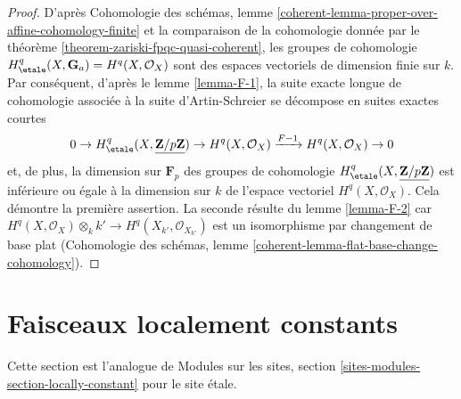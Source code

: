 \begin{proof}
D'apr\`es Cohomologie des schémas, lemme
\ref{coherent-lemma-proper-over-affine-cohomology-finite}
et la comparaison de la cohomologie donn\'ee par le
th\'eor\`eme \ref{theorem-zariski-fpqc-quasi-coherent}, les groupes de cohomologie
$H^q_\etale(X, \mathbf{G}_a) = H^q(X, \mathcal{O}_X)$ sont
des espaces vectoriels de dimension finie sur $k$. Par cons\'equent, d'apr\`es le
lemme \ref{lemma-F-1}, la suite exacte longue de cohomologie
associ\'ee \`a la suite d'Artin-Schreier se d\'ecompose en
suites exactes courtes
$$
0 \to H_\etale^q(X, \underline{\mathbf{Z}/p\mathbf{Z}}) \to
H^q(X, \mathcal{O}_X) \xrightarrow{F - 1} H^q(X, \mathcal{O}_X) \to 0
$$
et, de plus, la dimension sur $\mathbf{F}_p$ des groupes de cohomologie
$H_\etale^q(X, \underline{\mathbf{Z}/p\mathbf{Z}})$ est inf\'erieure ou \'egale \`a la
dimension sur $k$ de l'espace vectoriel $H^q(X, \mathcal{O}_X)$.
Cela d\'emontre la premi\`ere assertion. La seconde r\'esulte
du lemme \ref{lemma-F-2}
car $H^q(X, \mathcal{O}_X) \otimes_k k' \to H^q(X_{k'}, \mathcal{O}_{X_{k'}})$
est un isomorphisme par changement de base plat
(Cohomologie des schémas,
lemme \ref{coherent-lemma-flat-base-change-cohomology}).
\end{proof}








\section{Faisceaux localement constants}
\label{section-locally-constant}

\noindent
Cette section est l'analogue de
Modules sur les sites, section \ref{sites-modules-section-locally-constant}
pour le site \'etale.

